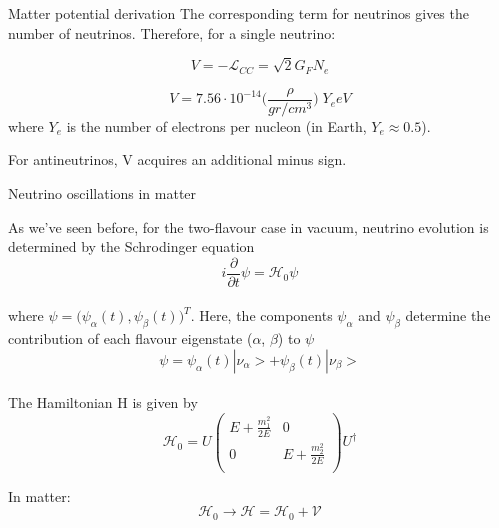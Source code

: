 {\begin{frame}{Matter potential derivation}
The corresponding term for neutrinos gives the number of neutrinos.
Therefore, for a single neutrino:

\begin{equation*}
V = -\mathcal{L}_{CC} = \sqrt{2} G_{F} N_{e}
\end{equation*}

\begin{equation*}
V = 7.56 \cdot 10^{-14} \Big( \frac{\rho}{gr/cm^{3}} \Big) \; Y_{e} eV
\end{equation*}
where $Y_{e}$ is the number of electrons per nucleon (in Earth, $Y_{e} \approx 0.5$).

For antineutrinos, V acquires an additional minus sign.

\end{frame}

}


%
%
%

\begin{frame}{Neutrino oscillations in matter}

As we've seen before, for the two-flavour case in vacuum,
neutrino evolution is determined by the Schrodinger equation
\begin{equation}
  i \frac{\partial}{\partial t} \psi = \mathcal{H}_{0} \psi
\end{equation}\\
where $\psi = \Big(\psi_{\alpha}(t), \psi_{\beta}(t)\Big)^T$.
Here, the components $\psi_{\alpha}$ and $\psi_{\beta}$
determine the contribution of each flavour eigenstate
($\alpha$, $\beta$) to $\psi$
\begin{equation}
  \psi = \psi_{\alpha}(t)|\nu_{\alpha}> + \psi_{\beta}(t)|\nu_{\beta}>
\end{equation}\\

The Hamiltonian H is given by
\begin{equation}
   \nonumber
   \mathcal{H}_{0}
   =
   U
   \begin{pmatrix}
     E + \frac{m^2_1}{2E} & 0 \\
     0 & E + \frac{m^2_2}{2E} \\
   \end{pmatrix}
   U^{\dagger}
\end{equation}

In matter:
\begin{equation*}
\mathcal{H}_{0} \rightarrow \mathcal{H} = \mathcal{H}_{0} + \mathcal{V}
\end{equation*}

\end{frame}


